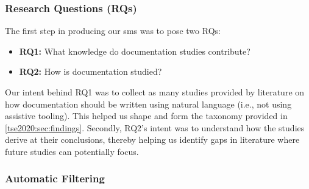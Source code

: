 \subsubsection{Research Questions (RQs)}

The first step in producing our \gls{sms} was to pose two RQs:
\begin{itemize}[leftmargin=\parindent]
  \item \textbf{RQ1:} What knowledge do  documentation studies contribute?
  \item \textbf{RQ2:} How is  documentation studied?
\end{itemize}
Our intent behind RQ1 was to collect as many studies provided by literature on how  documentation should be written using natural language (i.e., not using assistive tooling). This helped us shape and form the taxonomy provided in \cref{tse2020:sec:findings}. Secondly, RQ2's intent was to understand how the studies derive at their conclusions, thereby helping us identify gaps in literature where future studies can potentially focus.


\subsubsection{Automatic Filtering}

